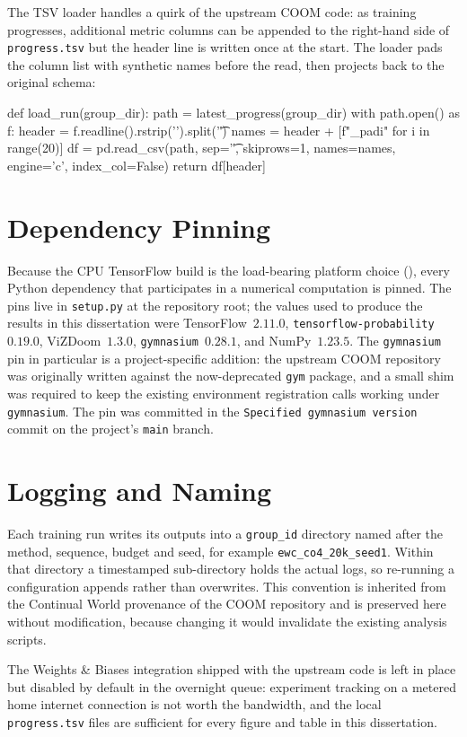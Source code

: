 The TSV loader handles a quirk of the upstream COOM code: as
training progresses, additional metric columns can be appended
to the right-hand side of \texttt{progress.tsv} but the header
line is written once at the start. The loader pads the column
list with synthetic names before the read, then projects back to
the original schema:

\begin{code}[language=Python, caption={Loader for COOM TSV
    training logs, handling the trailing-tab schema growth.
    See \Cref{lst:loader} in the appendix for the full
    implementation.},label={lst:loadersnippet}]
def load_run(group_dir):
    path = latest_progress(group_dir)
    with path.open() as f:
        header = f.readline().rstrip('\n').split('\t')
    names = header + [f"_pad{i}" for i in range(20)]
    df = pd.read_csv(path, sep='\t', skiprows=1, names=names,
                     engine='c', index_col=False)
    return df[header]
\end{code}

\section{Dependency Pinning}
\label{sec:pinning}

Because the CPU TensorFlow build is the load-bearing platform
choice (), every Python dependency that
participates in a numerical computation is pinned. The pins live
in \texttt{setup.py} at the repository root; the values used to
produce the results in this dissertation were
TensorFlow~$2.11.0$, \texttt{tensorflow-probability}~$0.19.0$,
ViZDoom~$1.3.0$, \texttt{gymnasium}~$0.28.1$, and NumPy~$1.23.5$.
The \texttt{gymnasium} pin in particular is a project-specific
addition: the upstream COOM repository was originally written
against the now-deprecated \texttt{gym} package, and a small
shim was required to keep the existing environment registration
calls working under \texttt{gymnasium}. The pin was committed in
the \texttt{Specified gymnasium version} commit
on the project's \texttt{main} branch.

\section{Logging and Naming}
\label{sec:logging}

Each training run writes its outputs into a \texttt{group\_id}
directory named after the method, sequence, budget and seed, for
example \texttt{ewc\_co4\_20k\_seed1}. Within that directory a
timestamped sub-directory holds the actual logs, so re-running a
configuration appends rather than overwrites. This convention is
inherited from the Continual World provenance of the COOM
repository \citep{wolczyk2021cwsac} and is preserved here
without modification, because changing it would invalidate the
existing analysis scripts.

The Weights \& Biases \citep{wandb} integration shipped with the
upstream code is left in place but disabled by default in the
overnight queue: experiment tracking on a metered home internet
connection is not worth the bandwidth, and the local
\texttt{progress.tsv} files are sufficient for every figure
and table in this dissertation.
